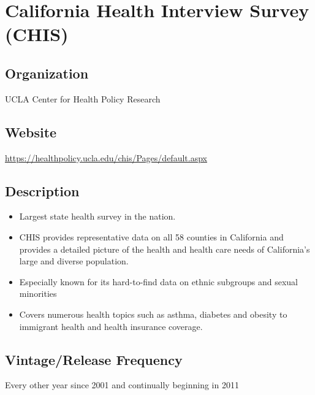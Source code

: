 \documentclass[
]{book}
\providecommand{\tightlist}{%
  \setlength{\itemsep}{0pt}\setlength{\parskip}{0pt}}
\begin{document}
\mainmatter

\hypertarget{california-health-interview-survey-chis}{%
\chapter{California Health Interview Survey (CHIS)}\label{california-health-interview-survey-chis}}

\hypertarget{organization-15}{%
\section{Organization}\label{organization-15}}

UCLA Center for Health Policy Research

\hypertarget{website-15}{%
\section{Website}\label{website-15}}

\url{https://healthpolicy.ucla.edu/chis/Pages/default.aspx}

\hypertarget{description-15}{%
\section{Description}\label{description-15}}

\begin{itemize}
\tightlist
\item
  Largest state health survey in the nation.
\item
  CHIS provides representative data on all 58 counties in California and provides a detailed picture of the health and health care needs of California's large and diverse population.
\item
  Especially known for its hard-to-find data on ethnic subgroups and sexual minorities
\item
  Covers numerous health topics such as asthma, diabetes and obesity to immigrant health and health insurance coverage.
\end{itemize}

\hypertarget{vintagerelease-frequency-15}{%
\section{Vintage/Release Frequency}\label{vintagerelease-frequency-15}}

Every other year since 2001 and continually beginning in 2011
\end{document}
